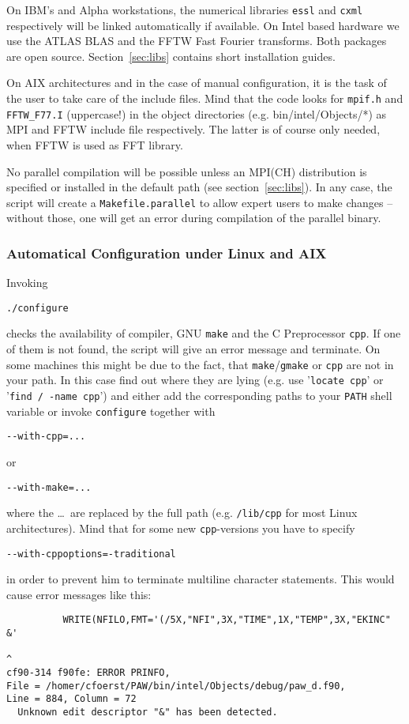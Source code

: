 \documentclass[a4paper,10pt]{article}
\begin{document}
On IBM's and Alpha workstations, the numerical libraries \texttt{essl} and
\texttt{cxml} respectively will be linked automatically if available.  On Intel
based hardware we use the \mbox{ATLAS} \mbox{BLAS} and the \mbox{FFTW} Fast
Fourier transforms. Both packages are open source.  Section~\ref{sec:libs}
contains short installation guides.

On AIX architectures and in the case of manual configuration, it is the task of
the user to take care of the include files.  Mind that the code looks for
\texttt{mpif.h} and \texttt{FFTW\_F77.I} (uppercase!) in the object directories
(e.g. bin/intel/Objects/*) as MPI and FFTW include file respectively.  The
latter is of course only needed, when FFTW is used as FFT library.

No parallel compilation will be possible unless an MPI(CH) distribution is
specified or installed in the default path (see section~\ref{sec:libs}).  In
any case, the script will create a \texttt{Makefile.parallel} to allow expert
users to make changes -- without those, one will get an error during
compilation of the parallel binary.  


\subsubsection*{Automatical Configuration under Linux and AIX}
\label{sub:auto}
Invoking
\begin{verbatim}
./configure
\end{verbatim}
checks the availability of compiler, GNU \texttt{make} and the C Preprocessor
\texttt{cpp}.  If one of them is not found, the script will give an error
message and terminate.  On some machines this might be due to the fact, that
\texttt{make}/\texttt{gmake} or \texttt{cpp} are not in your path.  In this
case find out where they are lying (e.g. use '\texttt{locate cpp}' or
'\texttt{find / -name cpp}') and either add the corresponding paths to your
\texttt{PATH} shell variable or invoke \texttt{configure} together with
\begin{verbatim}
--with-cpp=...
\end{verbatim}
or
\begin{verbatim}
--with-make=...
\end{verbatim}
where the \ldots\ are replaced by the full path (e.g. \texttt{/lib/cpp} for
most Linux architectures).  Mind that for some new \texttt{cpp}-versions you
have to specify
\begin{verbatim}
--with-cppoptions=-traditional
\end{verbatim}
in order to prevent him to terminate multiline character statements.  This
would cause error messages like this:
\begin{verbatim}
          WRITE(NFILO,FMT='(/5X,"NFI",3X,"TIME",1X,"TEMP",3X,"EKINC"   &'
                                                                       ^
cf90-314 f90fe: ERROR PRINFO, 
File = /homer/cfoerst/PAW/bin/intel/Objects/debug/paw_d.f90, 
Line = 884, Column = 72
  Unknown edit descriptor "&" has been detected.
\end{verbatim}
\end{document}

